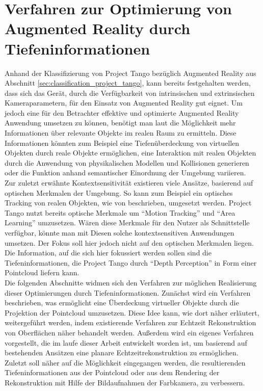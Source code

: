 \chapter{Verfahren zur Optimierung von Augmented Reality durch Tiefeninformationen} \label{sec:optimization}

Anhand der Klassifizierung von Project Tango bezüglich Augmented Reality aus Abschnitt \ref{sec:classification_project_tango}, kann bereits festgehalten werden, dass sich das Gerät, durch die Verfügbarkeit von intrinsischen und extrinsischen Kameraparametern, für den Einsatz von Augmented Reality gut eignet. Um jedoch eine für den Betrachter effektive und optimierte Augmented Reality Anwendung umsetzen zu können, benötigt man laut \citet{azuma2001recent} die Möglichkeit mehr Informationen über relevante Objekte im realen Raum zu ermitteln. Diese Informationen könnten zum Beispiel eine Tiefenüberdeckung von virtuellen Objekten durch reale Objekte ermöglichen, eine Interaktion mit realen Objekten durch die Anwendung von physikalischen Modellen und Kollisionen generieren oder die Funktion anhand semantischer Einordnung der Umgebung variieren. \\

Zur zuletzt erwähnte Kontextsensitivität existieren viele Ansätze, basierend auf optischen Merkmalen der Umgebung. So kann zum Beispiel ein optisches Tracking von realen Objekten, wie von \citet{lee2008hybrid} beschrieben, umgesetzt werden. Project Tango nutzt bereits optische Merkmale um \enquote{Motion Tracking} und \enquote{Area Learning} umzusetzen. Wären diese Merkmale für den Nutzer als Schnittstelle verfügbar, könnte man mit Diesen solche kontextsensitiven Anwendungen umsetzen. Der Fokus soll hier jedoch nicht auf den optischen Merkmalen liegen. Die Information, auf die sich hier fokussiert werden sollen sind die Tiefeninformationen, die Project Tango durch \enquote{Depth Perception} in Form einer Pointcloud liefern kann.\\

Die folgenden Abschnitte widmen sich den Verfahren zur möglichen Realisierung dieser Optimierungen durch Tiefeninformationen. Zunächst wird ein Verfahren beschrieben, was ermöglicht eine Überdeckung virtueller Objekte durch die Projektion der Pointcloud umzusetzen. Diese Idee kann, wie dort näher erläutert, weitergeführt werden, indem existierende Verfahren zur Echtzeit Rekonstruktion von Oberflächen näher behandelt werden. Außerdem wird ein eigenes Verfahren vorgestellt, die im laufe dieser Arbeit entwickelt worden ist, um basierend auf bestehenden Ansätzen eine planare Echtzeitrekonstruktion zu ermöglichen. Zuletzt soll näher auf die Möglichkeit eingegangen werden, die resultierenden Tiefeninformationen aus der Pointcloud oder aus dem Rendering der Rekonstruktion mit Hilfe der Bildaufnahmen der Farbkamera, zu verbessern. \\

